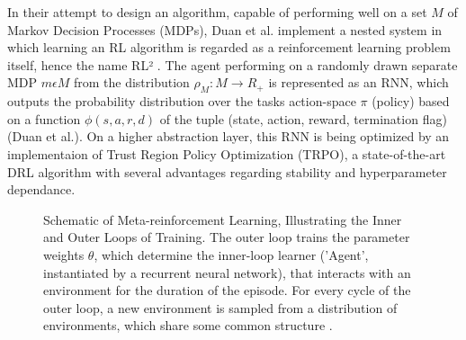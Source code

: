\documentclass[letterpaper, 10 pt, conference]{ieeeconf}  %
\begin{document}
In their attempt to design an algorithm, capable of performing well on a set $M$ of Markov Decision Processes (MDPs), Duan et al. implement a nested
system in which learning an RL algorithm is regarded as a reinforcement learning problem itself, hence the name RL² 
\cite{duanRLFastReinforcement2016}. The agent performing 
on a randomly drawn separate MDP $m \epsilon M$ from the distribution $\rho_{M} : M \longrightarrow R_{+}$ is represented as an RNN,
which outputs the probability distribution over the tasks action-space $\pi$ (policy) based on a function $\phi (s,a,r,d)$ of 
the tuple (state, action, reward, termination flag) (Duan et al.). On a higher abstraction layer, this RNN is being 
optimized by an implementaion of Trust Region Policy Optimization (TRPO), a 
state-of-the-art DRL algorithm \cite{schulmanTrustRegionPolicy2015} with several advantages regarding stability
 and hyperparameter dependance.\newline

\begin{figure}[thpb]
        \centering
  \caption{Schematic of Meta-reinforcement Learning, Illustrating the Inner and Outer Loops of Training. The
  outer loop trains the parameter weights $\theta$, which determine the inner-loop learner (’Agent’, instantiated by a recurrent
  neural network), that interacts with an environment for the duration of the episode. For every cycle of the outer loop, a new
  environment is sampled from a distribution of environments, which share some common structure \cite{botvinickReinforcementLearningFast2019}.}
        \label{figurelabel}
     \end{figure}
\end{document}
